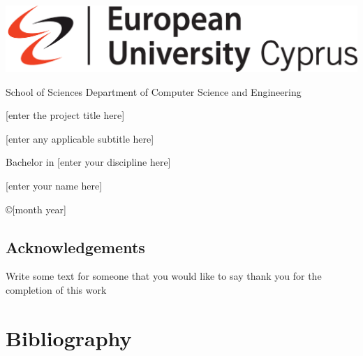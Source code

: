 \documentclass[12pt,a4paper]{report}
\begin{document}
\thispagestyle{empty}
{

\noindent\includegraphics[scale=0.32]{images/euc}


\begin{center}
 School of Sciences \textbar \; Department of Computer Science and Engineering
\end{center}

\vspace{1.5cm}
\begin{center}
\Huge  [enter the project title here]
\end{center}


\vspace{0.2cm}
\begin{center}
\Large [enter any applicable subtitle here]
\end{center}

\vspace{1.5cm}
\begin{center}\LARGE Bachelor in [enter your discipline here]
\end{center}


\vspace{1.5cm}
\begin{center}
\Large [enter your name here]
\end{center}
\vspace{1.5cm}

\noindent
\begin{center}\copyright  [month year]
\end{center}
\newpage
\thispagestyle{empty}

}%

\section*{Acknowledgements}
Write some text for someone that you would like to say thank you for the completion of this work

\newpage


\newpage







\chapter*{Bibliography}



\end{document}
